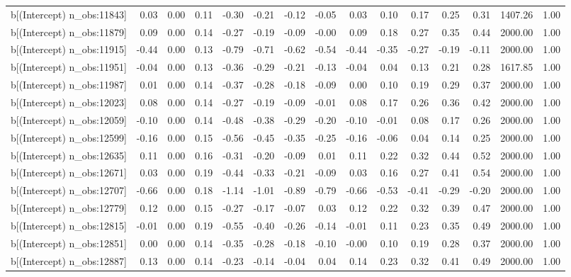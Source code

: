 \begin{table}[ht]
\begin{tabular}{rrrrrrrrrrrrrrr}
  b[(Intercept) n\_obs:11843] & 0.03 & 0.00 & 0.11 & -0.30 & -0.21 & -0.12 & -0.05 & 0.03 & 0.10 & 0.17 & 0.25 & 0.31 & 1407.26 & 1.00 \\ 
  b[(Intercept) n\_obs:11879] & 0.09 & 0.00 & 0.14 & -0.27 & -0.19 & -0.09 & -0.00 & 0.09 & 0.18 & 0.27 & 0.35 & 0.44 & 2000.00 & 1.00 \\ 
  b[(Intercept) n\_obs:11915] & -0.44 & 0.00 & 0.13 & -0.79 & -0.71 & -0.62 & -0.54 & -0.44 & -0.35 & -0.27 & -0.19 & -0.11 & 2000.00 & 1.00 \\ 
  b[(Intercept) n\_obs:11951] & -0.04 & 0.00 & 0.13 & -0.36 & -0.29 & -0.21 & -0.13 & -0.04 & 0.04 & 0.13 & 0.21 & 0.28 & 1617.85 & 1.00 \\ 
  b[(Intercept) n\_obs:11987] & 0.01 & 0.00 & 0.14 & -0.37 & -0.28 & -0.18 & -0.09 & 0.00 & 0.10 & 0.19 & 0.29 & 0.37 & 2000.00 & 1.00 \\ 
  b[(Intercept) n\_obs:12023] & 0.08 & 0.00 & 0.14 & -0.27 & -0.19 & -0.09 & -0.01 & 0.08 & 0.17 & 0.26 & 0.36 & 0.42 & 2000.00 & 1.00 \\ 
  b[(Intercept) n\_obs:12059] & -0.10 & 0.00 & 0.14 & -0.48 & -0.38 & -0.29 & -0.20 & -0.10 & -0.01 & 0.08 & 0.17 & 0.26 & 2000.00 & 1.00 \\ 
  b[(Intercept) n\_obs:12599] & -0.16 & 0.00 & 0.15 & -0.56 & -0.45 & -0.35 & -0.25 & -0.16 & -0.06 & 0.04 & 0.14 & 0.25 & 2000.00 & 1.00 \\ 
  b[(Intercept) n\_obs:12635] & 0.11 & 0.00 & 0.16 & -0.31 & -0.20 & -0.09 & 0.01 & 0.11 & 0.22 & 0.32 & 0.44 & 0.52 & 2000.00 & 1.00 \\ 
  b[(Intercept) n\_obs:12671] & 0.03 & 0.00 & 0.19 & -0.44 & -0.33 & -0.21 & -0.09 & 0.03 & 0.16 & 0.27 & 0.41 & 0.54 & 2000.00 & 1.00 \\ 
  b[(Intercept) n\_obs:12707] & -0.66 & 0.00 & 0.18 & -1.14 & -1.01 & -0.89 & -0.79 & -0.66 & -0.53 & -0.41 & -0.29 & -0.20 & 2000.00 & 1.00 \\ 
  b[(Intercept) n\_obs:12779] & 0.12 & 0.00 & 0.15 & -0.27 & -0.17 & -0.07 & 0.03 & 0.12 & 0.22 & 0.32 & 0.39 & 0.47 & 2000.00 & 1.00 \\ 
  b[(Intercept) n\_obs:12815] & -0.01 & 0.00 & 0.19 & -0.55 & -0.40 & -0.26 & -0.14 & -0.01 & 0.11 & 0.23 & 0.35 & 0.49 & 2000.00 & 1.00 \\ 
  b[(Intercept) n\_obs:12851] & 0.00 & 0.00 & 0.14 & -0.35 & -0.28 & -0.18 & -0.10 & -0.00 & 0.10 & 0.19 & 0.28 & 0.37 & 2000.00 & 1.00 \\ 
  b[(Intercept) n\_obs:12887] & 0.13 & 0.00 & 0.14 & -0.23 & -0.14 & -0.04 & 0.04 & 0.14 & 0.23 & 0.32 & 0.41 & 0.49 & 2000.00 & 1.00 \\ 

\end{tabular}
\end{table}

